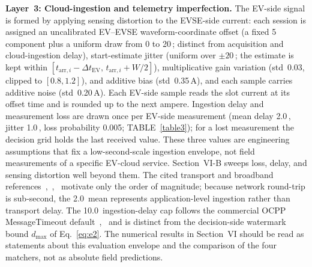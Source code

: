 \documentclass{ieeeaccess}
\newif\ifhighlight \highlightfalse
\DeclareRobustCommand{\revised}[1]{\ifhighlight{\color{blue}#1}\else{\color{.}#1}\fi}
\begin{document}
    \textbf{Layer~3: Cloud-ingestion and telemetry imperfection.}
    The EV-side signal is formed by applying sensing distortion to the EVSE-side current: each session is assigned an uncalibrated EV--EVSE waveform-coordinate offset (a fixed 5\, component plus a uniform draw from 0 to 20\,; distinct from acquisition and cloud-ingestion delay), start-estimate jitter \revised{(uniform over $\pm 20$\,; the estimate is kept within $[t_{\text{arr},i} - \Delta t_{\text{EV}},\, t_{\text{arr},i} + W/2]$)}, multiplicative gain variation (std~0.03\revised{, clipped to $[0.8, 1.2]$}), and additive bias (std~0.35\,A), and each sample carries additive noise (std~0.20\,A).
    \revised{Each EV-side sample reads the slot current at its offset time and is rounded up to the next ampere.
    Ingestion delay and measurement loss are drawn once per EV-side measurement (mean delay 2.0\,\text{sec}, jitter 1.0\,\text{sec}, loss probability 0.005; TABLE~\ref{table3}); for a lost measurement the decision grid holds the last received value.
    These three values} are engineering assumptions that fix a low-second-scale ingestion envelope, not field measurements of a specific EV-cloud service. \revised{Section~VI-B sweeps loss, delay, and sensing distortion well beyond them.} The cited transport and broadband references~\cite{b23},~\cite{b24},~\cite{b25} motivate only the order of magnitude; because network round-trip is sub-second, the 2.0\, mean represents application-level ingestion rather than transport delay. The 10.0\, ingestion-delay cap follows the commercial OCPP MessageTimeout default~\cite{bzaptec},~\cite{b22} and is distinct from the decision-side watermark bound $d_{\max}$ of Eq.~\eqref{eq:e2}.
    The numerical results in Section~VI should be read as statements about this evaluation envelope and the \revised{comparison of} the four matchers, not as absolute field predictions.
\end{document}
